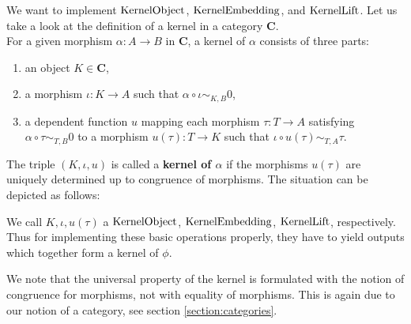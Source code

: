 \begin{example}
 We want to implement $\mathrm{KernelObject}$, $\mathrm{KernelEmbedding}$, and $\mathrm{KernelLift}$.
 Let us take a look at the definition of a kernel in a category $\mathbf{C}$. \\
 For a given morphism $\alpha: A \rightarrow B$ in $\mathbf{C}$, a kernel of $\alpha$ consists of three parts:
 \begin{enumerate}
  \item an object $K \in \mathbf{C}$,
  \item a morphism $\iota: K \rightarrow A$ such that $\alpha \circ \iota \sim_{K,B} 0$,
  \item a dependent function $u$ mapping each morphism $\tau: T \rightarrow A$ satisfying $\alpha \circ \tau \sim_{T,B} 0$ to
  a morphism $u(\tau): T \rightarrow K$ such that $\iota \circ u( \tau ) \sim_{T,A} \tau$. 
 \end{enumerate}
 The triple $( K, \iota, u )$ is called a \textbf{kernel of $\alpha$} if the morphisms $u( \tau )$ are uniquely determined up to
 congruence of morphisms. The situation can be depicted as follows:
 
 \begin{center}
\end{center}
 
 We call $K, \iota, u( \tau ) $ a $\mathrm{KernelObject}$, $\mathrm{KernelEmbedding}$, $\mathrm{KernelLift}$, respectively.
 Thus for implementing these basic operations properly, they have to yield outputs which together form a kernel of $\phi$.
\end{example}

\begin{remark}
 We note that the universal property of the kernel is formulated with the notion of congruence for morphisms,
 not with equality of morphisms. This is again due to our notion of a category, see section \ref{section:categories}.
\end{remark}


